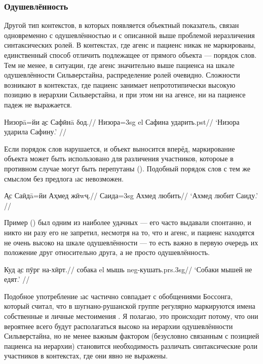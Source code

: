 \subsubsection{Одушевлённость} \label{dom-animacy}

Другой тип контекстов, в которых появляется объектный показатель, связан одновременно с одушевлённостью и с описанной выше проблемой неразличения синтаксических ролей. В контекстах, где агенс и пациенс никак не маркированы, единственный способ отличить подлежащее от прямого объекта — порядок слов. Тем не менее, в ситуации, где агенс значительно выше пациенса на шкале одушевлённости Сильверстайна, распределение ролей очевидно. Сложности возникают в контекстах, где пациенс занимает непрототипически высокую позицию в иерархии Сильверстайна, и при этом ни на агенсе, ни на пациенсе падеж не выражается.

\begingl
\gla Низорā=йи \b{ас} Сафӣнā δод.//
\glc Низора={\sc 3sg} {\sc el} Сафина ударить.{\sc pst}//
\glft ‘Низора ударила Сафину.’ \trailingcitation{[элицитация, 2022]}//
\endgl \xe

Если порядок слов нарушается, и объект выносится вперёд, маркирование объекта может быть использовано для различения участников, котороые в противном случае могут быть перепутаны (). Подобный порядок слов с тем же смыслом без предлога \i{ас} невозможен.

\begingl
\gla \b{Ас} Саӣдā=йи Аҳмед жӣwҷ.//
 Саида={\sc 3sg} Ахмед любить//
\glft ‘Ахмед любит Саиду.’ \trailingcitation{[элицитация, 2022]}//
\endgl \xe

Пример () был одним из наиболее удачных — его часто выдавали спонтанно, и никто ни разу его не запретил, несмотря на то, что и агенс, и пациенс находятся не очень высоко на шкале одушевлённости — то есть важно в первую очередь их положение друг относительно друга, а не просто одушевлённость.

\begingl
\gla Куд \b{ас} пӯрг на-хӣрт.//
\glc собака {\sc el} мышь {\sc neg}-кушать.{\sc prs.3sg}//
\glft ‘Собаки мышей не едят.’ \trailingcitation{[элицитация, 2022]}//
\endgl \xe

Подобное употребление \i{ас} частично совпадает с обобщениями Боссонга, который считал, что в шугнано-рушанской группе регулярно маркируются имена собственные и личные местоимения \parencite[102]{bossong1985}. Я полагаю, это происходит потому, что они вероятнее всего будут располагаться высоко на иерархии одушевлённости Сильверстайна, но не менее важным фактором (безусловно связанным с позицией пациенса на иерархии) становится необходимость различать синтаксические роли участников в контекстах, где они явно не выражены.

